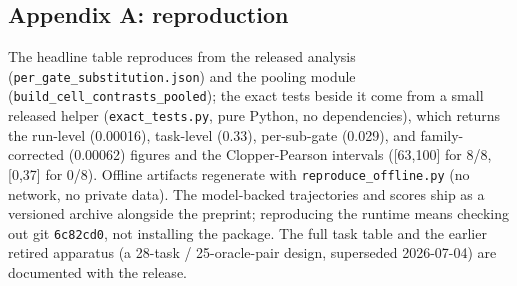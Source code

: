 \documentclass[
]{article}
\begin{document}
\subsection{Appendix A: reproduction}\label{appendix-a-reproduction}

The headline table reproduces from the released analysis
(\texttt{per\_gate\_substitution.json}) and the pooling module
(\texttt{build\_cell\_contrasts\_pooled}); the exact tests beside it
come from a small released helper (\texttt{exact\_tests.py}, pure
Python, no dependencies), which returns the run-level (0.00016),
task-level (0.33), per-sub-gate (0.029), and family-corrected (0.00062)
figures and the Clopper-Pearson intervals ({[}63,100{]} for 8/8,
{[}0,37{]} for 0/8). Offline artifacts regenerate with
\texttt{reproduce\_offline.py} (no network, no private data). The
model-backed trajectories and scores ship as a versioned archive
alongside the preprint; reproducing the runtime means checking out git
\texttt{6c82cd0}, not installing the package. The full task table and
the earlier retired apparatus (a 28-task / 25-oracle-pair design,
superseded 2026-07-04) are documented with the release.
\end{document}
